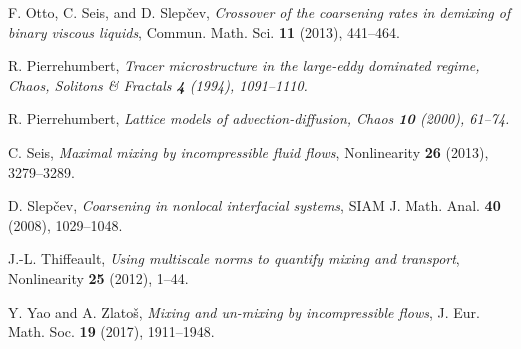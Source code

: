 \documentclass[12pt]{article}
\numberwithin{figure}{section}
\numberwithin{equation}{section}
\begin{document}
\begin{thebibliography}{99}
%

F. Otto, C. Seis, and D. Slep\v{c}ev,
{\it Crossover of the coarsening rates in demixing of binary viscous liquids},
Commun. Math. Sci. {\bf 11} (2013), 441--464.

R. Pierrehumbert, 
\it Tracer microstructure in the large-eddy dominated regime, 
\rm Chaos, Solitons \& Fractals {\bf 4} (1994), 1091--1110.

R. Pierrehumbert, 
\it Lattice models of advection-diffusion, 
\rm Chaos {\bf 10} (2000), 61--74.

C. Seis,
{\it  Maximal mixing by incompressible fluid flows},
Nonlinearity {\bf 26} (2013), 3279--3289.

D. Slep\v{c}ev,
{\it Coarsening in nonlocal interfacial systems}, 
SIAM J. Math. Anal. {\bf 40} (2008), 1029--1048.




J.-L. Thiffeault,
{\it Using multiscale norms to quantify mixing and transport},
Nonlinearity {\bf 25} (2012), 1--44.


Y. Yao and A. Zlato\v{s},
{\it  Mixing and un-mixing by incompressible flows},
J. Eur. Math. Soc. {\bf 19} (2017), 1911--1948. 


\end{thebibliography}

\Addresses
\end{document}
